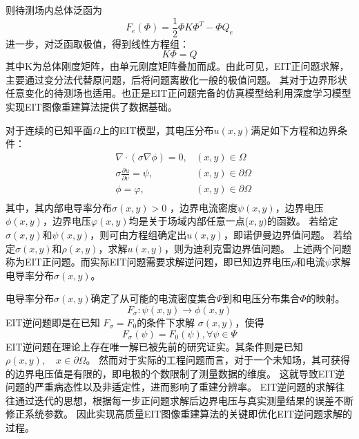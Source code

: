 则待测场内总体泛函为
\boldmath
\begin{equation}
  F_e(\Phi) = \frac{1}{2} \Phi K \Phi^T - \Phi Q_e
\end{equation}
\unboldmath
进一步，对泛函取极值，得到线性方程组：
\boldmath
\begin{equation}
  K\Phi = Q
\end{equation}
\unboldmath
其中K为总体刚度矩阵，由单元刚度矩阵叠加而成\cite{2019d_cc}。由此可见，EIT正问题求解，主要通过变分法代替原问题，后将问题离散化一般的极值问题。
其对于边界形状任意变化的待测场也适用。也正是EIT正问题完备的仿真模型给利用深度学习模型实现EIT图像重建算法提供了数据基础。

对于连续的已知平面$\Omega$上的EIT模型，其电压分布$u(x,y)$满足如下方程和边界条件：
\begin{equation}
  \begin{aligned}
  &\nabla \cdot (\sigma \nabla \phi) = 0, &(x, y)\in {\Omega} \\
  &\sigma\frac{\partial{u}}{\partial{v}} = \psi, &(x,y) \in {\partial{\Omega}} \\
  &\phi = \varphi, &(x,y)\in\partial{\Omega} \\
\end{aligned}
\end{equation}
其中，其内部电导率分布$\sigma(x,y) > 0$ ，边界电流密度$\psi(x,y)$，边界电压$\phi(x,y)$，边界电压$\varphi(x,y)$均是关于场域内部任意一点($x,y)$的函数。
若给定$\sigma(x,y)$和$\psi(x,y)$，则可由方程组确定出$u(x,y)$，即诺伊曼边界值问题。
若给定$\sigma(x,y)$和$\rho(x,y)$，求解$u(x,y)$，则为迪利克雷边界值问题。
上述两个问题称为EIT正问题。而实际EIT问题需要求解逆问题，即已知边界电压$\rho$和电流$\psi$求解电导率分布$\sigma(x,y)$。

电导率分布$\sigma(x,y)$确定了从可能的电流密度集合$\Psi$到和电压分布集合$\Phi$的映射。
\begin{equation}
  F_\sigma: \psi(x,y) \rightarrow \phi(x,y)
\end{equation}
EIT逆问题即是在已知 $F_{\sigma} = F_0$的条件下求解 $\sigma(x,y)$，使得
\begin{equation}
  F_{\sigma}(\psi) = F_{0}(\psi),  \forall \psi \in \Psi
\end{equation}
EIT逆问题在理论上存在唯一解已被先前的研究证实\cite{Sun1993An}。其条件则是已知$\rho(x,y),\quad x \in \partial \Omega$。
然而对于实际的工程问题而言，对于一个未知场，其可获得的边界电压值是有限的，即电极的个数限制了测量数据的维度。
这就导致EIT逆问题的严重病态性以及非适定性，进而影响了重建分辨率。
EIT逆问题的求解往往通过迭代的思想，根据每一步正问题求解后边界电压与真实测量结果的误差不断修正系统参数。
因此实现高质量EIT图像重建算法的关键即优化EIT逆问题求解的过程。

